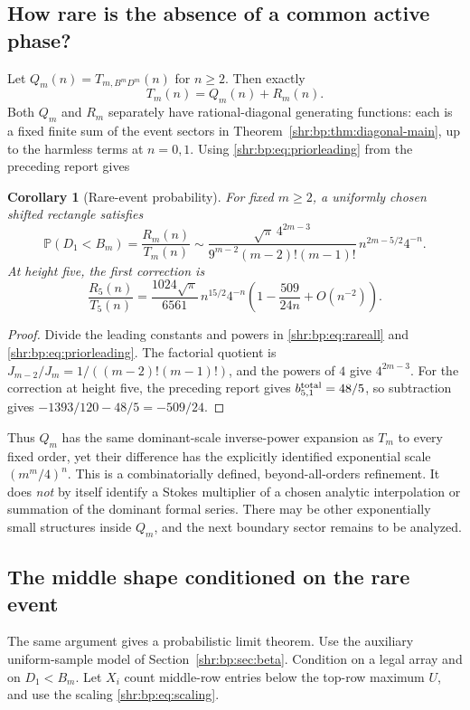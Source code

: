 \documentclass[11pt,letterpaper]{article}
\numberwithin{equation}{section}
\newtheorem{corollary}[theorem]{Corollary}
\theoremstyle{definition}
\newcommand{\1}{\mathbf 1}
\newcommand{\PP}{\mathbb P}
\begin{document}
\subsection{How rare is the absence of a common active phase?}
Let $Q_m(n)=T_{m,B^mD^m}(n)$ for $n\ge2$. Then exactly
\begin{equation}
 T_m(n)=Q_m(n)+R_m(n).
 \label{shr:bp:eq:two-sector}
\end{equation}
Both $Q_m$ and $R_m$ separately have rational-diagonal generating
functions: each is a fixed finite sum of the event sectors in
Theorem~\ref{shr:bp:thm:diagonal-main}, up to the harmless terms at $n=0,1$.
Using \eqref{shr:bp:eq:priorleading} from the preceding report gives
\begin{corollary}[Rare-event probability]
\label{shr:bp:cor:probability}
For fixed $m\ge2$, a uniformly chosen shifted rectangle satisfies
\begin{equation}
 \PP(D_1<B_m)=\frac{R_m(n)}{T_m(n)}
 \sim\frac{\sqrt\pi\,4^{2m-3}}
 {9^{m-2}(m-2)!(m-1)!}\,n^{2m-5/2}4^{-n}.
 \label{shr:bp:eq:rareprob}
\end{equation}
At height five, the first correction is
\begin{equation}
 \frac{R_5(n)}{T_5(n)}=
 \frac{1024\sqrt\pi}{6561}\,n^{15/2}4^{-n}
 \left(1-\frac{509}{24n}+O(n^{-2})\right).
 \label{shr:bp:eq:rareprob5}
\end{equation}
\end{corollary}
\begin{proof}
Divide the leading constants and powers in
\eqref{shr:bp:eq:rareall} and \eqref{shr:bp:eq:priorleading}. The factorial quotient is
$J_{m-2}/J_m=1/((m-2)!(m-1)!)$, and the powers of $4$ give $4^{2m-3}$.
For the correction at height five, the preceding report gives
$b_{5,1}^{\rm total}=48/5$, so subtraction gives
$-1393/120-48/5=-509/24$.
\end{proof}

Thus $Q_m$ has the same dominant-scale inverse-power expansion as $T_m$
to every fixed order, yet their difference has the explicitly identified
exponential scale $(m^m/4)^n$. This is a combinatorially defined,
beyond-all-orders refinement. It does \emph{not} by itself identify a
Stokes multiplier of a chosen analytic interpolation or summation of the
dominant formal series. There may be other exponentially small structures
inside $Q_m$, and the next boundary sector remains to be analyzed.

\subsection{The middle shape conditioned on the rare event}
The same argument gives a probabilistic limit theorem. Use the auxiliary
uniform-sample model of Section~\ref{shr:bp:sec:beta}. Condition on a legal array
and on $D_1<B_m$. Let $X_i$ count middle-row entries below the top-row
maximum $U$, and use the scaling \eqref{shr:bp:eq:scaling}.
\end{document}
